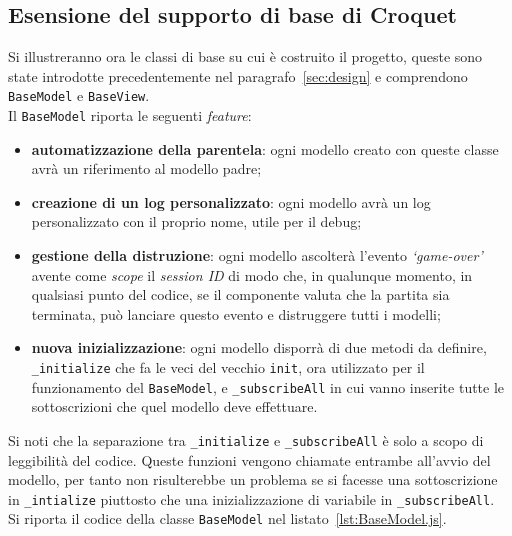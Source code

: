 \subsection{Esensione del supporto di base di Croquet}
Si illustreranno ora le classi di base su cui è costruito il progetto, queste sono state introdotte precedentemente nel paragrafo~\ref{sec:design} e comprendono \texttt{BaseModel} e \texttt{BaseView}.\\
Il \texttt{BaseModel} riporta le seguenti \textit{feature}:
\begin{itemize}
    \item \textbf{automatizzazione della parentela}: ogni modello creato con queste classe avrà un riferimento al modello padre;
    \item \textbf{creazione di un log personalizzato}: ogni modello avrà un log personalizzato con il proprio nome, utile per il debug;
    \item \textbf{gestione della distruzione}: ogni modello ascolterà l'evento \textit{`game-over'} avente come \textit{scope} il \textit{session ID} di modo che, in qualunque momento, in qualsiasi
    punto del codice, se il componente valuta che la partita sia terminata, può lanciare questo evento e distruggere tutti i modelli;
    \item \textbf{nuova inizializzazione}: ogni modello disporrà di due metodi da definire, \texttt{\_initialize} che fa le veci del vecchio \texttt{init}, ora utilizzato per il funzionamento
    del \texttt{BaseModel}, e \texttt{\_subscribeAll} in cui vanno inserite tutte le sottoscrizioni che quel modello deve effettuare.
\end{itemize}
Si noti che la separazione tra \texttt{\_initialize} e \texttt{\_subscribeAll} è solo a scopo di leggibilità del codice. Queste funzioni vengono chiamate entrambe all'avvio del modello, per
tanto non risulterebbe un problema se si facesse una sottoscrizione in \texttt{\_intialize} piuttosto che una inizializzazione di variabile in \texttt{\_subscribeAll}.\\
Si riporta il codice della classe \texttt{BaseModel} nel listato~\ref{lst:BaseModel.js}.

